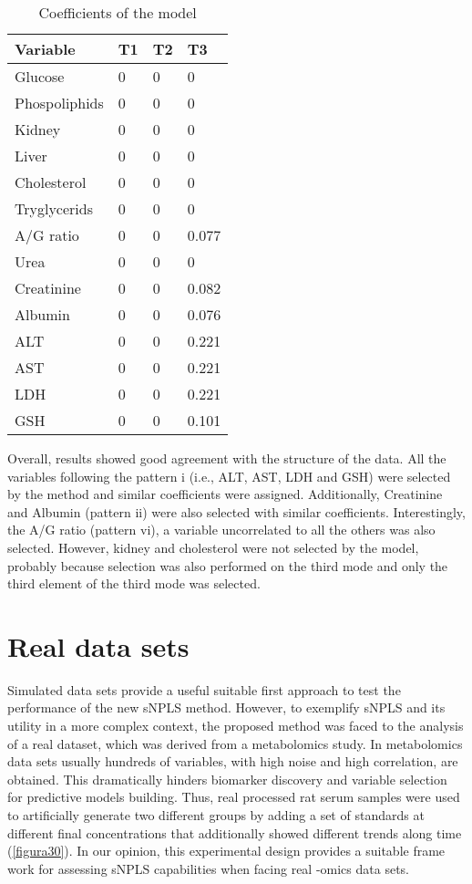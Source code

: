 \begin{table}[hbtp]
\centering
\begin{tabular}{@{}llll@{}}
\toprule
Variable      & T1 & T2 & T3    \\ \midrule
Glucose       & 0  & 0  & 0     \\
Phospoliphids & 0  & 0  & 0     \\
Kidney        & 0  & 0  & 0     \\
Liver         & 0  & 0  & 0     \\
Cholesterol   & 0  & 0  & 0     \\
Tryglycerids  & 0  & 0  & 0     \\
A/G ratio     & 0  & 0  & 0.077 \\
Urea          & 0  & 0  & 0     \\
Creatinine    & 0  & 0  & 0.082 \\
Albumin       & 0  & 0  & 0.076 \\
ALT           & 0  & 0  & 0.221 \\
AST           & 0  & 0  & 0.221 \\
LDH           & 0  & 0  & 0.221 \\
GSH           & 0  & 0  & 0.101 \\ \bottomrule
\end{tabular}%
\caption[Coefficients of the model for the data driven synthetic data set]{Coefficients of the model}
\label{table:results_synth2}
\end{table}

Overall, results showed good agreement with the structure of the data. All the variables  following the pattern i (i.e., ALT, AST, LDH and GSH) were selected by the method and similar coefficients  were assigned. Additionally, Creatinine and Albumin (pattern ii) were also selected with similar coefficients. Interestingly,  the A/G ratio (pattern vi), a variable uncorrelated to all the others was also selected. However, kidney and cholesterol were not selected by the model, probably because selection was also performed on the third mode and only the third element of the third mode was selected.


\section{Real data sets}
\label{sec:realdata}
Simulated data sets provide a useful suitable first approach to test the performance of the new sNPLS method. However, to exemplify sNPLS and its utility in a more complex context, the proposed method was faced to the analysis of a real dataset, which was derived from a metabolomics study. In metabolomics data sets usually hundreds of variables, with high noise and high correlation, are obtained. This dramatically hinders biomarker discovery and variable selection for predictive models building.  Thus, real processed rat serum samples were used to artificially generate two different groups by adding a set of standards at different final concentrations that additionally showed different trends along time (\autoref{figura30}). In our opinion, this experimental design provides a suitable frame work for assessing sNPLS capabilities when facing real -omics data sets.


